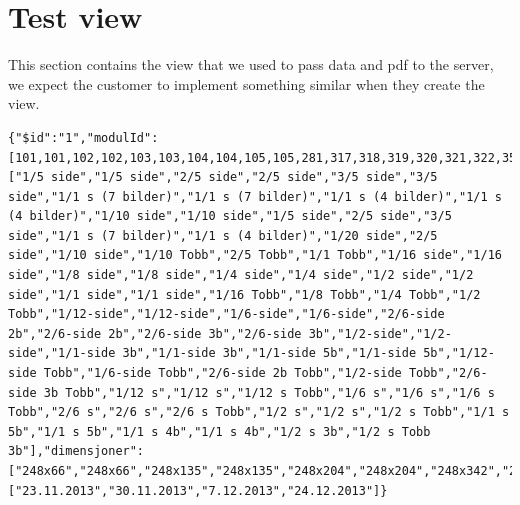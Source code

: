 
\chapter{Test view}
This section contains the view that we used to pass data and pdf to the server, we expect the customer to implement something similar when they create the view.

\begin{verbatim}
{"$id":"1","modulId":[101,101,102,102,103,103,104,104,105,105,281,317,318,319,320,321,322,357,448,449,461,462,463,526,526,527,527,528,528,529,529,530,530,531,532,533,534,800,800,801,801,802,802,803,803,804,804,805,805,806,806,807,808,809,810,836,861,861,862,863,863,864,865,865,866,867,867,868,869,869,870,870,974,975],"modulNavn":["1/5 side","1/5 side","2/5 side","2/5 side","3/5 side","3/5 side","1/1 s (7 bilder)","1/1 s (7 bilder)","1/1 s (4 bilder)","1/1 s (4 bilder)","1/10 side","1/10 side","1/5 side","2/5 side","3/5 side","1/1 s (7 bilder)","1/1 s (4 bilder)","1/20 side","2/5 side","1/10 side","1/10 Tobb","2/5 Tobb","1/1 Tobb","1/16 side","1/16 side","1/8 side","1/8 side","1/4 side","1/4 side","1/2 side","1/2 side","1/1 side","1/1 side","1/16 Tobb","1/8 Tobb","1/4 Tobb","1/2 Tobb","1/12-side","1/12-side","1/6-side","1/6-side","2/6-side 2b","2/6-side 2b","2/6-side 3b","2/6-side 3b","1/2-side","1/2-side","1/1-side 3b","1/1-side 3b","1/1-side 5b","1/1-side 5b","1/12-side Tobb","1/6-side Tobb","2/6-side 2b Tobb","1/2-side Tobb","2/6-side 3b Tobb","1/12 s","1/12 s","1/12 s Tobb","1/6 s","1/6 s","1/6 s Tobb","2/6 s","2/6 s","2/6 s Tobb","1/2 s","1/2 s","1/2 s Tobb","1/1 s 5b","1/1 s 5b","1/1 s 4b","1/1 s 4b","1/2 s 3b","1/2 s Tobb 3b"],"dimensjoner":["248x66","248x66","248x135","248x135","248x204","248x204","248x342","248x342","248x342","248x342","122x66","122x66","248x66","248x135","248x204","248x342","248x342","60x66","248x135","122x66","122x66","248x135","248x342","122x41","122x41","122x85","122x85","122x173","122x173","248x173","248x173","248x349","248x349","122x41","122x85","122x173","248x173","122x55","122x55","248x55","248x55","248x113","248x113","248x113","248x113","248x171","248x171","248x345","248x345","248x345","248x345","122x55","248x55","248x113","248x171","248x113","122x55","122x55","122x55","248x55","248x55","248x55","248x113","248x113","248x113","248x171","248x171","248x171","248x345","248x345","248x345","248x345","248x171","248x171"],"datoTilgjengelig":["23.11.2013","30.11.2013","7.12.2013","24.12.2013"]}
\end{verbatim}
